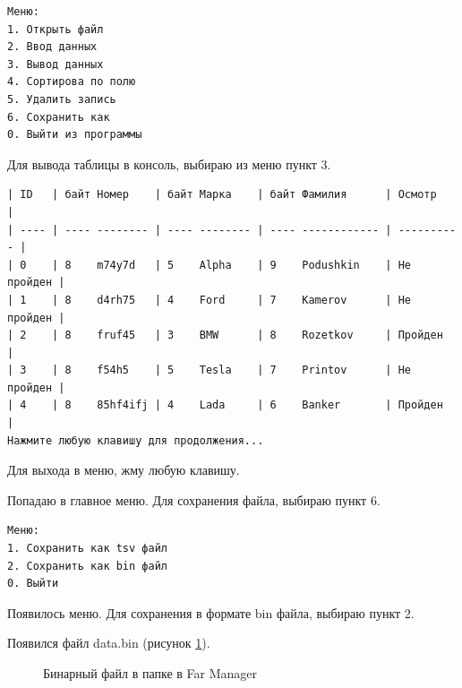 \begin{tcolorbox}
\begin{verbatim}
Меню:
1. Открыть файл
2. Ввод данных
3. Вывод данных
4. Сортирова по полю
5. Удалить запись
6. Сохранить как
0. Выйти из программы
\end{verbatim}
\end{tcolorbox}

Для вывода таблицы в консоль, выбираю из меню пункт 3.
\begin{tcolorbox}
\begin{verbatim}
| ID   | байт Номер    | байт Марка    | байт Фамилия      | Осмотр     |
| ---- | ---- -------- | ---- -------- | ---- ------------ | ---------- |
| 0    | 8    m74y7d   | 5    Alpha    | 9    Podushkin    | Не пройден |
| 1    | 8    d4rh75   | 4    Ford     | 7    Kamerov      | Не пройден |
| 2    | 8    fruf45   | 3    BMW      | 8    Rozetkov     | Пройден    |
| 3    | 8    f54h5    | 5    Tesla    | 7    Printov      | Не пройден |
| 4    | 8    85hf4ifj | 4    Lada     | 6    Banker       | Пройден    |
Нажмите любую клавишу для продолжения...
\end{verbatim}
\end{tcolorbox}

Для выхода в меню, жму любую клавишу.

Попадаю в главное меню. Для сохранения файла, выбираю пункт 6.

\begin{tcolorbox}
\begin{verbatim}
Меню:
1. Сохранить как tsv файл
2. Сохранить как bin файл
0. Выйти
\end{verbatim}
\end{tcolorbox}

Появилось меню. Для сохранения в формате bin файла, выбираю пункт 2.

Появился файл data.bin (рисунок \ref{fig:far_folder}).

\begin{figure}[p]
    \caption{Бинарный файл в папке в Far Manager}
    \label{fig:far_folder}
\end{figure}

